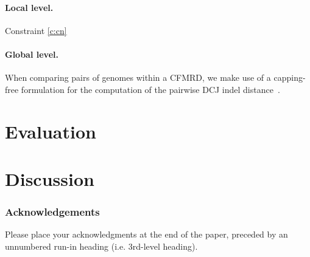 \documentclass[runningheads]{llncs}
\begin{document}
\paragraph{Local level.} Constraint \ref{c:cn} 

\paragraph{Global level.}
When comparing pairs of genomes within a CFMRD, we make use of a capping-free formulation for the computation of the pairwise DCJ indel distance~\cite{BOH-2023}.





\section{Evaluation}
\section{Discussion}



\subsubsection{Acknowledgements} Please place your acknowledgments at
the end of the paper, preceded by an unnumbered run-in heading (i.e.
3rd-level heading).

%
%
%


\end{document}
